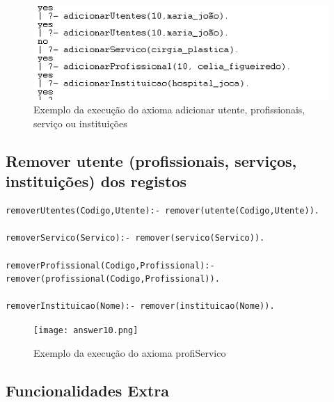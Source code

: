\begin{figure}[<+htpb+>]
	\centering
	\includegraphics[scale=0.9]{answer9.png}
	\caption{Exemplo da execução do axioma adicionar utente, profissionais, serviço ou instituições}
	\label{p3:fig:output9}
\end{figure}

\subsection{Remover utente (profissionais, serviços, instituições) dos registos}

\begin{Verbatim}
removerUtentes(Codigo,Utente):- remover(utente(Codigo,Utente)).

removerServico(Servico):- remover(servico(Servico)).

removerProfissional(Codigo,Profissional):- remover(profissional(Codigo,Profissional)).

removerInstituicao(Nome):- remover(instituicao(Nome)).
\end{Verbatim}

\begin{figure}[<+htpb+>]
	\centering
	\texttt{[image: answer10.png]}
	\caption{Exemplo da execução do axioma profiServico}
	\label{p3:fig:output10}
\end{figure}

\subsection{Funcionalidades Extra}
